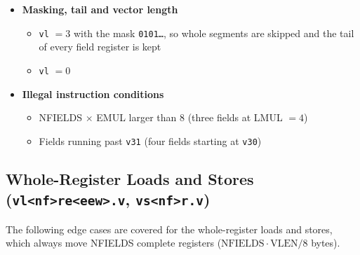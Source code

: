 \documentclass[11pt,a4paper]{article}
\begin{document}
\begin{itemize}
    \item \textbf{Masking, tail and vector length}
    \begin{itemize}
        \item \texttt{vl} $= 3$ with the mask \texttt{0101\ldots}, so whole segments are skipped
              and the tail of every field register is kept
        \item \texttt{vl} $= 0$
    \end{itemize}

    \item \textbf{Illegal instruction conditions}
    \begin{itemize}
        \item NFIELDS $\times$ EMUL larger than 8 (three fields at LMUL $= 4$)
        \item Fields running past \texttt{v31} (four fields starting at \texttt{v30})
    \end{itemize}
\end{itemize}

\subsection*{Whole-Register Loads and Stores (\texttt{vl<nf>re<eew>.v}, \texttt{vs<nf>r.v})}
\label{subsec:ldst-whole}

The following edge cases are covered for the whole-register loads and stores, which always move
NFIELDS complete registers ($\mathrm{NFIELDS} \cdot \mathrm{VLEN}/8$ bytes).
\end{document}
